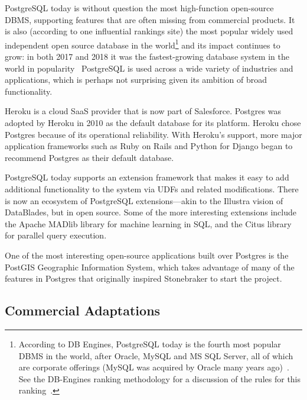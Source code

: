 \documentclass[sigconf,natbib=false]{acmart}
\begin{document}
PostgreSQL today is without question the most high-function open-source DBMS, supporting features that are often missing from commercial products. It is also (according to one influential rankings site) the most popular widely used independent open source database in the world\footnote{According to DB Engines, PostgreSQL today is the fourth most popular DBMS in the world, after Oracle, MySQL and MS SQL Server, all of which are corporate offerings (MySQL was acquired by Oracle many years ago)~\cite{dbengines}.  See the DB-Engines ranking methodology for a discussion of the rules for this ranking~\cite{dbengines-methodology}.} and its impact continues to grow: in both 2017 and 2018 it was the fastest-growing database system in the world in popularity~\cite{dbengines-dbms-of-the-year} PostgreSQL is used across a wide variety of industries and applications, which is perhaps not surprising given its ambition of broad functionality.

Heroku is a cloud SaaS provider that is now part of Salesforce. Postgres was adopted by Heroku in 2010 as the default database for its platform. Heroku chose Postgres because of its operational reliability. With Heroku's support, more major application frameworks such as Ruby on Rails and Python for Django began to recommend Postgres as their default database. 

PostgreSQL today supports an extension framework that makes it easy to add additional functionality to the system via UDFs and related modifications. There is now an ecosystem of PostgreSQL extensions---akin to the Illustra vision of DataBlades, but in open source. Some of the more interesting extensions include the Apache MADlib library for machine learning in SQL, and the Citus library for parallel query execution.

One of the most interesting open-source applications built over Postgres is the PostGIS Geographic Information System, which takes advantage of many of the features in Postgres that originally inspired Stonebraker to start the project.

\subsection{Commercial Adaptations}
\end{document}
